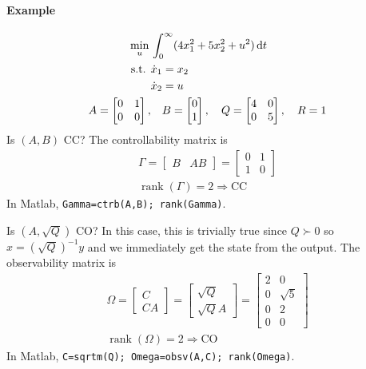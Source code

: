 \paragraph{Example} \mbox{}
\begin{align}
  \min_u {} & \int_0^\infty (4x_1^2 + 5x_2^2 + u^2) \mathop{}\!\mathrm{d} t \\
  \text{s.t. } & \dot x_1 = x_2 \\
            & \dot x_2 = u \\
  A = \begin{bmatrix}
    0 & 1 \\ 0 & 0
  \end{bmatrix}, & \quad B = \begin{bmatrix}
    0 \\ 1
  \end{bmatrix}, \quad Q = \begin{bmatrix}
    4 & 0 \\ 0 & 5
  \end{bmatrix}, \quad R = 1
\end{align}
Is $(A,B)$ CC? The controllability matrix is
\begin{gather}
  \Gamma = \begin{bmatrix}
    B & AB
  \end{bmatrix} = \begin{bmatrix}
    0 & 1 \\ 1 & 0
  \end{bmatrix} \\
  \mathop\text{rank}(\Gamma) = 2 \Rightarrow \text{CC}
\end{gather}
In Matlab, \texttt{Gamma=ctrb(A,B); rank(Gamma)}.

Is $(A,\sqrt{Q})$ CO? In this case, this is trivially true since $Q\succ0$ so $x=(\sqrt{Q})^{-1}y$ and we immediately get the state from the output. The observability matrix is
\begin{gather}
  \Omega = \begin{bmatrix}
    C \\ CA
  \end{bmatrix} = \begin{bmatrix}
    \sqrt{Q} \\ \sqrt{Q} A
  \end{bmatrix} = \begin{bmatrix}
    2 & 0 \\
    0 & \sqrt{5} \\
    0 & 2 \\
    0 & 0
  \end{bmatrix} \\
  \mathop\text{rank}(\Omega) = 2 \Rightarrow \text{CO}
\end{gather}
In Matlab, \texttt{C=sqrtm(Q); Omega=obsv(A,C); rank(Omega)}.

